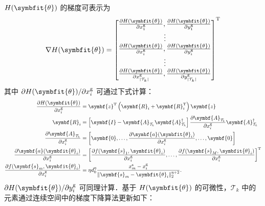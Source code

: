 \documentclass[a4paper,zihao=-4]{ctexart}
\renewcommand{\mathbf}[1]{\symbf{#1}}
\renewcommand{\boldsymbol}[1]{\symbfit{#1}}
\begin{document}
$H(\boldsymbol{\theta})$ 的梯度可表示为
\begin{equation}
    \label{eq:gradient_H}
    \nabla H(\boldsymbol{\theta}) = \begin{bmatrix}
        \frac{\partial H(\boldsymbol{\theta})}{\partial x_1^\mathrm{g}}, \frac{\partial H(\boldsymbol{\theta})}{\partial y_1^\mathrm{g}} \\
        \vdots \\
        \frac{\partial H(\boldsymbol{\theta})}{\partial x_i^\mathrm{g}}, \frac{\partial H(\boldsymbol{\theta})}{\partial y_i^\mathrm{g}} \\
        \vdots \\
        \frac{\partial H(\boldsymbol{\theta})}{\partial x_{|\mathcal{T}_k|}^\mathrm{g}}, \frac{\partial H(\boldsymbol{\theta})}{\partial y_{|\mathcal{T}_k|}^\mathrm{g}}
    \end{bmatrix}^{\mathrm{T}}
\end{equation}
其中 $\partial H(\boldsymbol{\theta})/\partial x_i^\mathrm{g}$ 可通过下式计算：
\begin{equation}
    \label{eq:partial_derivative_x}
    \begin{aligned}
        \frac{\partial H(\boldsymbol{\theta})}{\partial x_i^\mathrm{g}} &= \mathbf{z}^{\mathrm{T}} \left( \mathbf{R}_i + \mathbf{R}_i^{\mathrm{T}} \right) \mathbf{z} \\
        \mathbf{R}_i &= \left[ \mathbf{I} - \mathbf{A}_{\mathcal{T}_k} \mathbf{A}_{\mathcal{T}_k}^{\dagger} \right] \frac{\partial \mathbf{A}_{\mathcal{T}_k}}{\partial x_i^\mathrm{g}} \mathbf{A}_{\mathcal{T}_k}^{\dagger} \\
        \frac{\partial \mathbf{A}_{\mathcal{T}_k}}{\partial x_i^\mathrm{g}} &= \left[ \mathbf{0}, \ldots, \frac{\partial \mathbf{a}(\boldsymbol{\theta}_i)}{\partial x_i^\mathrm{g}}, \ldots, \mathbf{0} \right] \\
        \frac{\partial \mathbf{a}(\boldsymbol{\theta}_i)}{\partial x_i^\mathrm{g}} &= \left[ \frac{\partial f(\mathbf{s}_1, \boldsymbol{\theta}_i)}{\partial x_i^\mathrm{g}}, \ldots, \frac{\partial f(\mathbf{s}_M, \boldsymbol{\theta}_i)}{\partial x_i^\mathrm{g}} \right]^{\mathrm{T}} \\
        \frac{\partial f(\mathbf{s}_m, \boldsymbol{\theta}_i)}{\partial x_i^\mathrm{g}} &= \eta d_0^\eta \frac{x_m^\mathrm{s} - x_i^\mathrm{g}}{\| \mathbf{s}_m - \boldsymbol{\theta}_i \|_2^{\eta+2}}.
    \end{aligned}
\end{equation}
$\partial H(\boldsymbol{\theta})/\partial y_i^\mathrm{g}$ 可同理计算．基于 $H(\boldsymbol{\theta})$ 的可微性，$\mathcal{T}_k$ 中的元素通过连续空间中的梯度下降算法更新如下：
\end{document}
